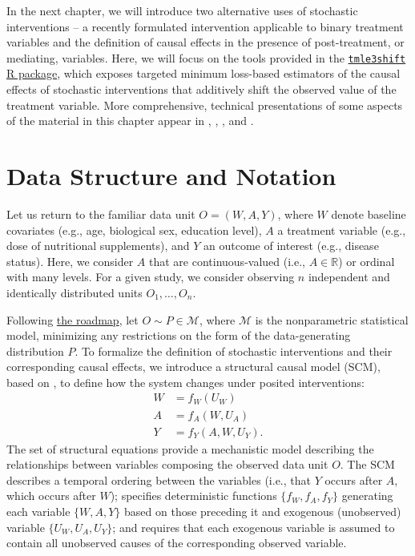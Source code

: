 \documentclass[
  12pt, krantz2,
]{krantz}
\newcommand{\passthrough}[1]{#1}
\newcommand{\R}{\mathbb{R}}
\newcommand{\M}{\mathcal{M}}
\newcommand{\1}{\mathbbm{1}}
\theoremstyle{definition}
\theoremstyle{definition}
\theoremstyle{definition}
\theoremstyle{definition}
\theoremstyle{remark}
\begin{document}
In the next chapter, we will introduce two alternative uses of stochastic
interventions -- a recently formulated intervention applicable to binary
treatment variables \citep{kennedy2019nonparametric} and the definition of causal
effects in the presence of post-treatment, or mediating, variables. Here, we
will focus on the tools provided in the \href{https://github.com/tlverse/tmle3shift}{\passthrough{\lstinline!tmle3shift!} R
package}, which exposes targeted minimum
loss-based estimators of the causal effects of stochastic interventions that
additively shift the observed value of the treatment variable. More
comprehensive, technical presentations of some aspects of the material in this
chapter appear in \citet{diaz2012population}, \citet{diaz2018stochastic},
\citet{hejazi2020efficient}, and \citet{hejazi2021semiparametric}.

\hypertarget{data-structure-and-notation-1}{%
\section{Data Structure and Notation}\label{data-structure-and-notation-1}}

Let us return to the familiar data unit \(O = (W, A, Y)\), where \(W\) denote
baseline covariates (e.g., age, biological sex, education level), \(A\) a
treatment variable (e.g., dose of nutritional supplements), and \(Y\) an outcome
of interest (e.g., disease status). Here, we consider \(A\) that are
continuous-valued (i.e., \(A \in \R\)) or ordinal with many levels. For a given
study, we consider observing \(n\) independent and identically distributed units
\(O_1, \ldots, O_n\).

Following \protect\hyperlink{roadmap}{the roadmap}, let \(O \sim P \in \M\), where \(\M\) is the
nonparametric statistical model, minimizing any restrictions on the form of the
data-generating distribution \(P\). To formalize the definition of stochastic
interventions and their corresponding causal effects, we introduce a structural
causal model (SCM), based on \citet{pearl2009causality}, to define how the system
changes under posited interventions:
\begin{align}
  W &= f_W(U_W) \\ \nonumber
  A &= f_A(W, U_A) \\ \nonumber
  Y &= f_Y(A, W, U_Y).
  \label{eq:npsem-shift}
\end{align}
The set of structural equations provide a mechanistic model describing the
relationships between variables composing the observed data unit \(O\). The SCM
describes a temporal ordering between the variables (i.e., that \(Y\) occurs after
\(A\), which occurs after \(W\)); specifies deterministic functions \(\{f_W, f_A, f_Y\}\) generating each variable \(\{W, A, Y\}\) based on those preceding it and
exogenous (unobserved) variable \(\{U_W, U_A, U_Y\}\); and requires that each
exogenous variable is assumed to contain all unobserved causes of the
corresponding observed variable.
\end{document}
